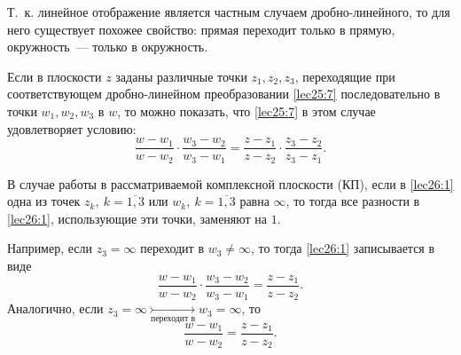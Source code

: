 \documentclass[../../main.tex]{subfiles}
\begin{document}
Т.~к. линейное отображение
является частным случаем дробно-линейного, то для него существует
похожее свойство: прямая переходит только в прямую,
окружность~--- только в окружность.

Если в плоскости \textcircled{$z$} заданы различные точки $z_1, z_2, z_3$,
переходящие при соответствующем дробно-линейном преобразовании 
\eqref{lec25:7} последовательно в точки $w_1, w_2, w_3$ в 
\textcircled{$w$}, то можно показать, что \eqref{lec25:7} в этом случае
удовлетворяет условию:
\begin{equation}
\label{lec26:1} \frac{w - w_1}{w - w_2} \cdot \frac{w_3 - w_2}{w_3 - w_1} = 
\frac{z - z_1}{z - z_2} \cdot \frac{z_3 - z_2}{z_3 - z_1}.
\end{equation}

В случае работы в рассматриваемой комплексной плоскости (КП), если в 
\eqref{lec26:1} одна из точек
$z_k ,\ k = \overline{1,3}$ или $w_k ,\ k = \overline{1,3}$ равна 
$\infty$, то тогда все разности в \eqref{lec26:1}, использующие 
эти точки, заменяют на $1$.

Например, если $z_3 = \infty$ переходит в $w_3 \neq \infty$, то тогда 
\eqref{lec26:1} записывается в виде
\[
\frac{w - w_1}{w - w_2} \cdot \frac{w_3 - w_2}{w_3 - w_1} = 
\frac{z - z_1}{z - z_2}.
\]
Аналогично, если 
$z_3 = \infty \underset{\text{переходит в}}{\rightarrowtail} w_3 = \infty$, то
\[
\frac{w - w_1}{w - w_2} = \frac{z - z_1}{z - z_2}.
\]
\end{document}
